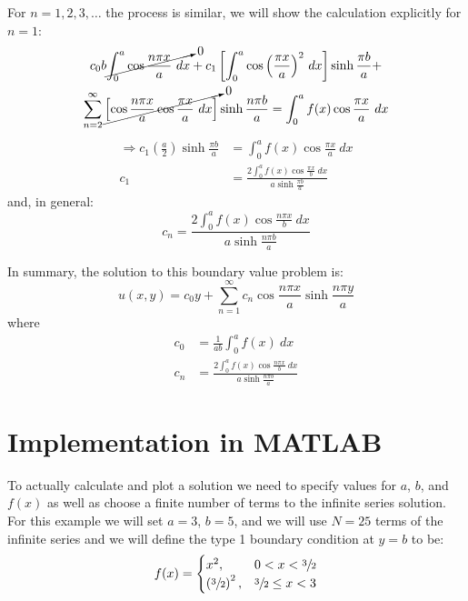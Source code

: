 \vspace{0.25cm}

\noindent For $n=1,2,3,\dots$ the process is similar, we will show the calculation explicitly for $n=1$:
\begin{multline*}
c_0b\cancelto{0}{\int_{0}^{a} \cos{\frac{n \pi x}{a}} \ dx} + c_1\left[\int_0^a \cos{\left(\frac{\pi x}{a}\right)}^2 \ dx \right]\sinh{\frac{\pi b}{a}} + \\ \sum\limits_{n=2}^{\infty} \cancelto{0}{\left[\cos{\frac{n \pi x}{a}}\cos{\frac{ \pi x}{a}} \ dx \right]}\sinh{\frac{n \pi b}{a}} = \int_0^a f(x) \cos{\frac{\pi x}{a}} \ dx 
\end{multline*}
\begin{align*}
\Rightarrow c_1 \left(\frac{a}{2} \right)\sinh{\frac{\pi b}{a}} &= \int_0^a f(x) \cos{\frac{\pi x}{a}} \ dx \\
c_1 &= \frac{2\int_0^a f(x) \cos{\frac{\pi x}{b}} \ dx}{a \sinh{\frac{\pi b}{a}}}
\end{align*}
and, in general:
\begin{equation*}
c_n = \frac{2\int_0^a f(x) \cos{\frac{n \pi x}{b}} \ dx}{a \sinh{\frac{n \pi b}{a}}}
\end{equation*}

\vspace{0.25cm}

\noindent In summary, the solution to this boundary value problem is:
\begin{equation*}
u(x,y) = c_0y + \sum\limits_{n=1}^{\infty} c_n \cos{\frac{n \pi x}{a}} \sinh{\frac{n \pi y}{a}}
\end{equation*}
where
\begin{align*}
c_0 &= \frac{1}{ab}\int_0^a f(x) \ dx \\
c_n &= \frac{2\int_0^a f(x) \cos{\frac{n \pi x}{b}} \ dx}{a \sinh{\frac{n \pi b}{a}}}
\end{align*}

\section{Implementation in MATLAB}

To actually calculate and plot a solution we need to specify values for $a$, $b$, and $f(x)$ as well as choose a finite number of terms to the infinite series solution.  For this example we will set $a=3$, $b=5$, and we will use $N=25$ terms of the infinite series and we will define the type 1 boundary condition at $y=b$ to be:
\begin{equation*}
f(x) = 
\begin{cases}
x^2, & 0 < x < \sfrac{3}{2} \\
\left(\sfrac{3}{2} \right)^2, & \sfrac{3}{2} \le x < 3
\end{cases}
\end{equation*}

